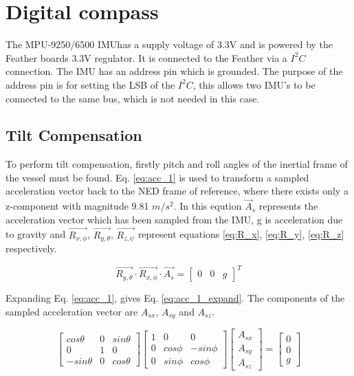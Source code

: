 \section{Digital compass}
The MPU-9250/6500 IMUhas a supply voltage of 3.3V and is powered by the Feather boards 3.3V regulator. It is connected to the Feather via a $I^{2}C$ connection. The IMU has an address pin 
which is grounded. The purpose of the address pin is for setting the LSB of the $I^{2}C$, this allows two IMU's to be connected to the same bus, which is not needed in this case. 

\subsection{Tilt Compensation}

To perform tilt compensation, firstly pitch and roll angles of the inertial frame of the vessel must be found. Eq. \ref{eq:acc_1} is used to transform a sampled acceleration vector back to 
the NED frame of reference, where there exists only a z-component with magnitude 9.81 $m/s^2$. In this eqution $\vec{A}_s$ represents the acceleration vector which has been 
sampled from the IMU, g is acceleration due to gravity and $\vec{R_{x,\phi}}$, $\vec{R_{y,\theta}}$, $\vec{R_{z,\psi}}$ represent equations \ref{eq:R_x}, \ref{eq:R_y}, \ref{eq:R_z} 
respectively. 

\begin{equation}
    \label{eq:acc_1}
    \vec{R_{y,\theta}} \cdot \vec{R_{x,\phi}} \cdot \vec{A_s} = \begin{bmatrix} 0 & 0 & g \end{bmatrix}^T
\end{equation}

Expanding Eq. \ref{eq:acc_1}, gives Eq. \ref{eq:acc_1_expand}. The components of the sampled acceleration vector are $A_{sx}$, $A_{sy}$ and $A_{sz}$.

\begin{equation}
    \label{eq:acc_2}
    \begin{bmatrix} cos\theta & 0 & sin\theta \\ 0 & 1 & 0 \\ -sin\theta & 0 & cos\theta \end{bmatrix} \begin{bmatrix} 1 & 0 & 0 \\ 0 & cos\phi & -sin\phi \\ 0 & sin\phi & cos\phi \end{bmatrix} \begin{bmatrix} A_{sx} \\ A_{sy} \\ A_{sz} \end{bmatrix}= \begin{bmatrix} 0 \\ 0 \\ g \end{bmatrix}
\end{equation}

